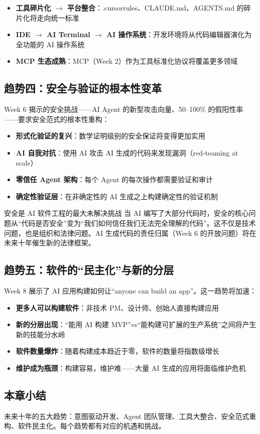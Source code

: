 \begin{itemize}
    \item \textbf{工具碎片化 $\rightarrow$ 平台整合}：.cursorrules、CLAUDE.md、AGENTS.md 的碎片化将走向统一标准
    \item \textbf{IDE $\rightarrow$ AI Terminal $\rightarrow$ AI 操作系统}：开发环境将从代码编辑器演化为全功能的 AI 操作系统
    \item \textbf{MCP 生态成熟}：MCP（Week 2）作为工具标准化协议将覆盖更多领域
\end{itemize}

\subsection{趋势四：安全与验证的根本性变革}

Week 6 揭示的安全挑战——AI Agent 的新型攻击向量、50--100\% 的假阳性率——要求安全范式的根本性重构：

\begin{itemize}
    \item \textbf{形式化验证的复兴}：数学证明级别的安全保证将变得更加实用
    \item \textbf{AI 自我对抗}：使用 AI 攻击 AI 生成的代码来发现漏洞（red-teaming at scale）
    \item \textbf{零信任 Agent 架构}：每个 Agent 的每次操作都需要验证和审计
    \item \textbf{确定性验证层}：在非确定性的 AI 生成之上构建确定性的验证机制
\end{itemize}

\begin{warningbox}{安全是 AI 软件工程的最大未解决挑战}
当 AI 编写了大部分代码时，安全的核心问题从``代码是否安全''变为``我们如何信任我们无法完全理解的代码''。这不仅是技术问题，也是组织和法律问题。AI 生成代码的责任归属（Week 6 的开放问题）将在未来十年催生新的法律框架。
\end{warningbox}

\subsection{趋势五：软件的``民主化''与新的分层}

Week 8 展示了 AI 应用构建如何让``anyone can build an app''。这一趋势将加速：

\begin{itemize}
    \item \textbf{更多人可以构建软件}：非技术 PM、设计师、创始人直接构建应用
    \item \textbf{新的分层出现}：``能用 AI 构建 MVP''vs``能构建可扩展的生产系统''之间将产生新的技能分水岭
    \item \textbf{软件数量爆炸}：随着构建成本趋近于零，软件的数量将指数级增长
    \item \textbf{维护成为瓶颈}：构建容易，维护难——大量 AI 生成的应用将面临维护危机
\end{itemize}

\subsection{本章小结}

未来十年的五大趋势：意图驱动开发、Agent 团队管理、工具大整合、安全范式重构、软件民主化。每个趋势都有对应的机遇和挑战。

